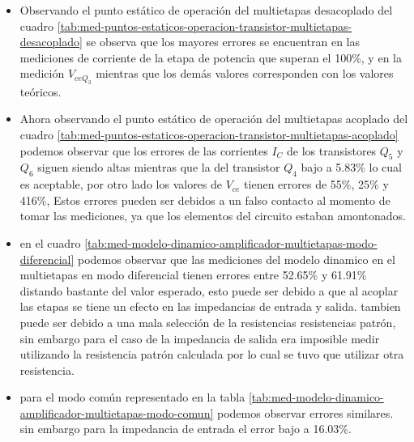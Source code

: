 \begin{itemize}
    \item Observando el punto estático de operación del multietapas desacoplado del cuadro \ref{tab:med-puntos-estaticos-operacion-transistor-multietapas-desacoplado} se observa que los mayores errores se encuentran en las mediciones de corriente de la etapa de potencia que superan el 100\%, y en la medición $V_{ceQ_3}$ mientras que los demás valores corresponden con los valores teóricos.
    \item Ahora observando el punto estático de operación del multietapas acoplado del cuadro \ref{tab:med-puntos-estaticos-operacion-transistor-multietapas-acoplado} podemos observar que los errores de las corrientes $I_C$ de los transistores $Q_5$ y $Q_6$ siguen siendo altas mientras que la del transistor $Q_4$ bajo a 5.83\% lo cual es aceptable, por otro lado los valores de $V_{ce}$ tienen errores de 55\%, 25\% y 416\%, Estos errores pueden ser debidos a un falso contacto al momento de tomar las mediciones, ya que los elementos del circuito estaban amontonados.
    \item en el cuadro \ref{tab:med-modelo-dinamico-amplificador-multietapas-modo-diferencial} podemos observar que las mediciones del modelo dinamico en el multietapas en modo diferencial tienen errores entre 52.65\% y 61.91\% distando bastante del valor esperado, esto puede ser debido a que al acoplar las etapas se tiene un efecto en las impedancias de entrada y salida. tambien puede ser debido a una mala selección de la resistencias resistencias patrón, sin embargo para el caso de la impedancia de salida era imposible medir utilizando la resistencia patrón calculada por lo cual se tuvo que utilizar otra resistencia.
    \item para el modo común representado en la tabla \ref{tab:med-modelo-dinamico-amplificador-multietapas-modo-comun} podemos observar errores similares. sin embargo para la impedancia de entrada el error bajo a 16.03\%.
\end{itemize}

